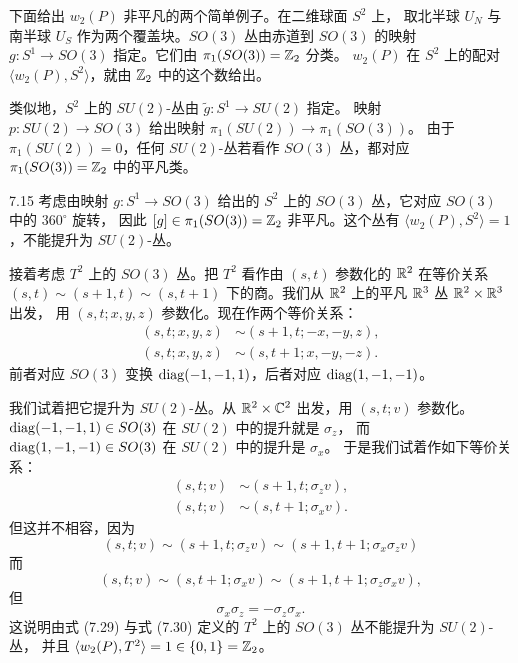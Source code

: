 下面给出 $w_2(P)$ 非平凡的两个简单例子。在二维球面 $S^2$ 上，
取北半球 $U_N$ 与南半球 $U_S$ 作为两个覆盖块。$SO(3)$ 丛由赤道到 $SO(3)$ 的映射
$g:S^1\to SO(3)$ 指定。它们由 $\pi_1(SO(3))=\mathbb{Z}_2$ 分类。
$w_2(P)$ 在 $S^2$ 上的配对 $\langle w_2(P),S^2\rangle$，就由 $\mathbb{Z}_2$ 中的这个数给出。

类似地，$S^2$ 上的 $SU(2)$-丛由 $\tilde g:S^1\to SU(2)$ 指定。
映射 $p:SU(2)\to SO(3)$ 给出映射 $\pi_1(SU(2))\to\pi_1(SO(3))$。
由于 $\pi_1(SU(2))=0$，任何 $SU(2)$-丛若看作 $SO(3)$ 丛，都对应
$\pi_1(SO(3))=\mathbb{Z}_2$ 中的平凡类。

\begin{example}{7.15}
考虑由映射 $g:S^1\to SO(3)$ 给出的 $S^2$ 上的 $SO(3)$ 丛，它对应 $SO(3)$ 中的 $360^\circ$ 旋转，
因此 $[g]\in\pi_1(SO(3))=\mathbb{Z}_2$ 非平凡。这个丛有 $\langle w_2(P),S^2\rangle=1$，不能提升为 $SU(2)$-丛。
\end{example}

接着考虑 $T^2$ 上的 $SO(3)$ 丛。把 $T^2$ 看作由 $(s,t)$ 参数化的 $\mathbb{R}^2$ 在等价关系
$(s,t)\sim(s+1,t)\sim(s,t+1)$ 下的商。我们从 $\mathbb{R}^2$ 上的平凡 $\mathbb{R}^3$ 丛 $\mathbb{R}^2\times\mathbb{R}^3$ 出发，
用 $(s,t;x,y,z)$ 参数化。现在作两个等价关系：
\begin{align}
(s,t;x,y,z)&\sim(s+1,t;-x,-y,z), \tag{7.29}\\
(s,t;x,y,z)&\sim(s,t+1;x,-y,-z). \tag{7.30}
\end{align}
前者对应 $SO(3)$ 变换 $\operatorname{diag}(-1,-1,1)$，后者对应 $\operatorname{diag}(1,-1,-1)$。

我们试着把它提升为 $SU(2)$-丛。从 $\mathbb{R}^2\times\mathbb{C}^2$ 出发，用 $(s,t;v)$ 参数化。
$\operatorname{diag}(-1,-1,1)\in SO(3)$ 在 $SU(2)$ 中的提升就是 $\sigma_z$，
而 $\operatorname{diag}(1,-1,-1)\in SO(3)$ 在 $SU(2)$ 中的提升是 $\sigma_x$。
于是我们试着作如下等价关系：
\begin{align}
(s,t;v)&\sim(s+1,t;\sigma_zv), \tag{7.31}\\
(s,t;v)&\sim(s,t+1;\sigma_xv). \tag{7.32}
\end{align}
但这并不相容，因为
\begin{equation}
(s,t;v)\sim(s+1,t;\sigma_zv)\sim(s+1,t+1;\sigma_x\sigma_zv)
\tag{7.33}
\end{equation}
而
\begin{equation}
(s,t;v)\sim(s,t+1;\sigma_xv)\sim(s+1,t+1;\sigma_z\sigma_xv),
\tag{7.34}
\end{equation}
但
\begin{equation}
\sigma_x\sigma_z=-\sigma_z\sigma_x.
\tag{7.35}
\end{equation}
这说明由式 (7.29) 与式 (7.30) 定义的 $T^2$ 上的 $SO(3)$ 丛不能提升为 $SU(2)$-丛，
并且 $\langle w_2(P),T^2\rangle=1\in\{0,1\}=\mathbb{Z}_2$。

